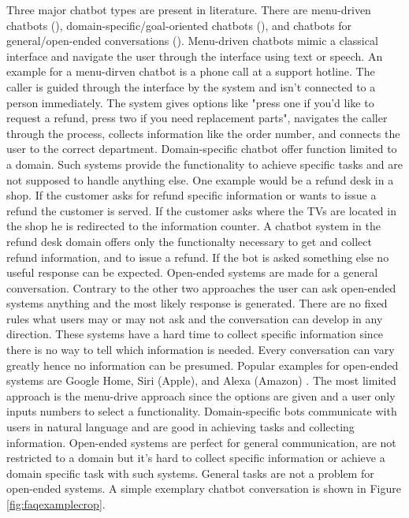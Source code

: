 Three major chatbot types are present in literature.
There are menu-driven chatbots (\citet{singhbuilding}), domain-specific/goal-oriented chatbots (\citet{deshpande2017survey, luis2015williams, braunEvaluatingNLU, williams2017hybrid}),
and chatbots for general/open-ended conversations (\citet{brandtzaeg2018chatbots, singhbuilding}).
Menu-driven chatbots mimic a classical interface and navigate the user through the 
interface using text or speech.
An example for a menu-dirven chatbot is a phone call at a support hotline.
The caller is guided through the interface by the system and isn't connected to a person immediately.
The system gives options like "press one if you'd like to request a refund, press two 
if you need replacement parts", navigates the caller through the process, collects information like the order number, and 
connects the user to the correct department.
Domain-specific chatbot offer function limited to a domain.
Such systems provide the functionality to achieve specific tasks and are not supposed to handle anything else.
One example would be a refund desk in a shop.
If the customer asks for refund specific information or wants to issue a refund the customer is served.
If the customer asks where the TVs are located in the shop he is redirected to the information counter.
A chatbot system in the refund desk domain offers only the functionalty necessary to get and collect refund information, 
and to issue a refund. If the bot is asked something else no useful response can be expected.
Open-ended systems are made for a general conversation.
Contrary to the other two approaches the user can ask open-ended systems anything and the most likely response is generated.
There are no fixed rules what users may or may not ask and the conversation can develop in any direction.
These systems have a hard time to collect specific information since there is no way to tell which information is needed.
Every conversation can vary greatly hence no information can be presumed.
Popular examples for open-ended systems are Google Home, Siri (Apple), and Alexa (Amazon) \cite{singhbuilding}.
The most limited approach is the menu-drive approach since the options are given and a user only inputs numbers to select a functionality.
Domain-specific bots communicate with users in natural language and are good in achieving tasks and collecting information.
Open-ended systems are perfect for general communication, are not restricted to a domain but it's hard to collect specific information
or achieve a domain specific task with such systems. General tasks are not a problem for open-ended systems.
A simple exemplary chatbot conversation is shown in Figure \ref{fig:faqexamplecrop}.

